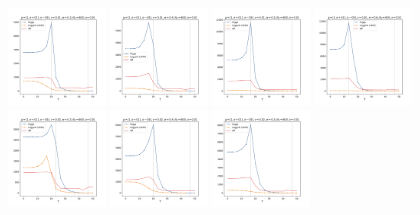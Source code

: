 \documentclass[a4paper]{article}
\begin{document}
\begin{figure}[H]
  \centering
  \includegraphics[width=0.23\textwidth]{grid-v1-w1_0}
  \includegraphics[width=0.23\textwidth]{grid-v1-w2_0}
  \includegraphics[width=0.23\textwidth]{grid-v1-w3_0}
  \includegraphics[width=0.23\textwidth]{grid-v1-w4_0}
  \\
  \includegraphics[width=0.23\textwidth]{grid-v2-w1_0}
  \includegraphics[width=0.23\textwidth]{grid-v2-w2_0}
  \includegraphics[width=0.23\textwidth]{grid-v2-w3_0}

\end{figure}
\end{document}
